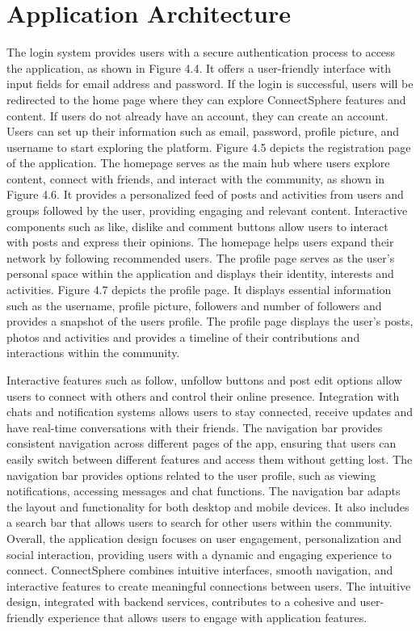 \section{Application Architecture}
The login system provides users with a secure authentication process to access the application, as shown in Figure 4.4. It offers a user-friendly interface with input fields for email address and password. If the login is successful, users will be redirected to the home page where they can explore ConnectSphere features and content. If users do not already have an account, they can create an account. Users can set up their information such as email, password, profile picture, and username to start exploring the platform. Figure 4.5 depicts the registration page of the application. The homepage serves as the main hub where users explore content, connect with friends, and interact with the community, as shown in Figure 4.6. It provides a personalized feed of posts and activities from users and groups followed by the user, providing engaging and relevant content. Interactive components such as like, dislike and comment buttons allow users to interact with posts and express their opinions. The homepage helps users expand their network by following recommended users. The profile page serves as the user's personal space within the application and displays their identity, interests and activities. Figure 4.7 depicts the profile page. It displays essential information such as the username, profile picture, followers and number of followers and provides a snapshot of the users profile. The profile page displays the user's posts, photos and activities and provides a timeline of their contributions and interactions within the community.

Interactive features such as follow, unfollow buttons and post edit options allow users to connect with others and control their online presence. Integration with chats and notification systems allows users to stay connected, receive updates and have real-time conversations with their friends. The navigation bar provides consistent navigation across different pages of the app, ensuring that users can easily switch between different features and access them without getting lost. The navigation bar provides options related to the user profile, such as viewing notifications, accessing messages and chat functions. The navigation bar adapts the layout and functionality for both desktop and mobile devices. It also includes a search bar that allows users to search for other users within the community.
Overall, the application design focuses on user engagement, personalization and social interaction, providing users with a dynamic and engaging experience to connect. ConnectSphere combines intuitive interfaces, smooth navigation, and interactive features to create meaningful connections between users. The intuitive design, integrated with backend services, contributes to a cohesive and user-friendly experience that allows users to engage with application features.  

